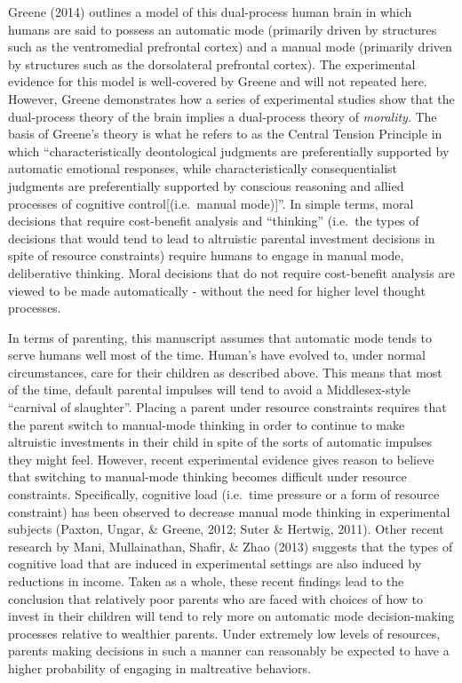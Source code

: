 \documentclass[]{elsarticle}
\begin{document}
Greene (2014) outlines a model of this dual-process human brain in which
humans are said to possess an automatic mode (primarily driven by
structures such as the ventromedial prefrontal cortex) and a manual mode
(primarily driven by structures such as the dorsolateral prefrontal
cortex). The experimental evidence for this model is well-covered by
Greene and will not repeated here. However, Greene demonstrates how a
series of experimental studies show that the dual-process theory of the
brain implies a dual-process theory of \emph{morality}. The basis of
Greene's theory is what he refers to as the Central Tension Principle in
which ``characteristically deontological judgments are preferentially
supported by automatic emotional responses, while characteristically
consequentialist judgments are preferentially supported by conscious
reasoning and allied processes of cognitive control{[}(i.e.~manual
mode){]}''. In simple terms, moral decisions that require cost-benefit
analysis and ``thinking'' (i.e.~the types of decisions that would tend
to lead to altruistic parental investment decisions in spite of resource
constraints) require humans to engage in manual mode, deliberative
thinking. Moral decisions that do not require cost-benefit analysis are
viewed to be made automatically - without the need for higher level
thought processes.

In terms of parenting, this manuscript assumes that automatic mode tends
to serve humans well most of the time. Human's have evolved to, under
normal circumstances, care for their children as described above. This
means that most of the time, default parental impulses will tend to
avoid a Middlesex-style ``carnival of slaughter''. Placing a parent
under resource constraints requires that the parent switch to
manual-mode thinking in order to continue to make altruistic investments
in their child in spite of the sorts of automatic impulses they might
feel. However, recent experimental evidence gives reason to believe that
switching to manual-mode thinking becomes difficult under resource
constraints. Specifically, cognitive load (i.e.~time pressure or a form
of resource constraint) has been observed to decrease manual mode
thinking in experimental subjects (Paxton, Ungar, \& Greene, 2012; Suter
\& Hertwig, 2011). Other recent research by Mani, Mullainathan, Shafir,
\& Zhao (2013) suggests that the types of cognitive load that are
induced in experimental settings are also induced by reductions in
income. Taken as a whole, these recent findings lead to the conclusion
that relatively poor parents who are faced with choices of how to invest
in their children will tend to rely more on automatic mode
decision-making processes relative to wealthier parents. Under extremely
low levels of resources, parents making decisions in such a manner can
reasonably be expected to have a higher probability of engaging in
maltreative behaviors.
\end{document}
